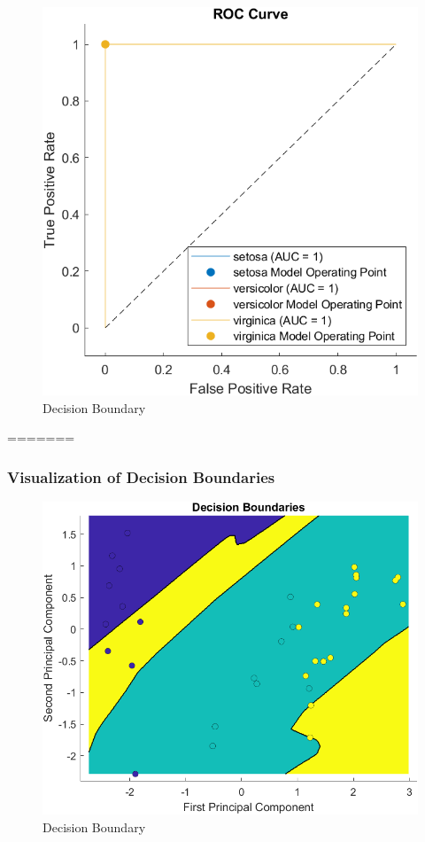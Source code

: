 \documentclass[conference]{inc/IEEEtran}
\begin{document}
  \begin{figure}
    \includegraphics[width=\linewidth]{figures/roc.png}
    \caption{Decision Boundary}
    \label{fig:boat1}
  \end{figure}
=======
\subsubsection{Visualization of Decision Boundaries}


\begin{figure}
  \includegraphics[width=\linewidth]{figures/DB.png}
  \caption{Decision Boundary}
  \label{fig:boat1}
\end{figure}
\end{document}
